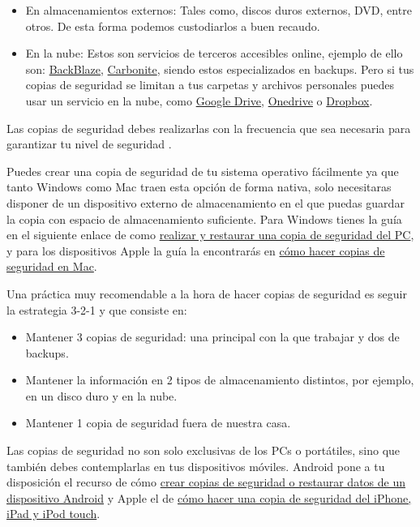 \documentclass[
  spanish,
  a4paper,
  openany]{book}
\begin{document}
\begin{itemize}
\item
  En almacenamientos externos: Tales como, discos duros externos, DVD, entre otros. De esta forma podemos custodiarlos a buen recaudo.
\item
  En la nube: Estos son servicios de terceros accesibles online, ejemplo de ello son: \href{https://www.backblaze.com/home-1.html}{BackBlaze}, \href{https://www.carbonite.com/}{Carbonite}, siendo estos especializados en backups. Pero si tus copias de seguridad se limitan a tus carpetas y archivos personales puedes usar un servicio en la nube, como \href{https://www.google.com/intl/en_in/drive/}{Google Drive}, \href{https://www.microsoft.com/en-us/microsoft-365/onedrive/online-cloud-storage}{Onedrive} o \href{https://www.dropbox.com/}{Dropbox}.
\end{itemize}

Las copias de seguridad debes realizarlas con la frecuencia que sea necesaria para garantizar tu nivel de seguridad \citep{tipos-copia-seguridad}.

Puedes crear una copia de seguridad de tu sistema operativo fácilmente ya que tanto Windows como Mac traen esta opción de forma nativa, solo necesitaras disponer de un dispositivo externo de almacenamiento en el que puedas guardar la copia con espacio de almacenamiento suficiente. Para Windows tienes la guía en el siguiente enlace de como \href{https://support.microsoft.com/es-es/windows/realizar-y-restaurar-una-copia-de-seguridad-del-pc-ac359b36-7015-4694-de9a-c5eac1ce9d9c}{realizar y restaurar una copia de seguridad del PC}, y para los dispositivos Apple la guía la encontrarás en \href{https://support.apple.com/es-es/mac-backup}{cómo hacer copias de seguridad en Mac}.

Una práctica muy recomendable a la hora de hacer copias de seguridad es seguir la estrategia 3-2-1 \citep{INCI-copia-3-2-1} y que consiste en:

\begin{itemize}
\item
  Mantener 3 copias de seguridad: una principal con la que trabajar y dos de backups.
\item
  Mantener la información en 2 tipos de almacenamiento distintos, por ejemplo, en un disco duro y en la nube.
\item
  Mantener 1 copia de seguridad fuera de nuestra casa.
\end{itemize}

Las copias de seguridad no son solo exclusivas de los PCs o portátiles, sino que también debes contemplarlas en tus dispositivos móviles. Android pone a tu disposición el recurso de cómo \href{https://support.google.com/android/answer/2819582?hl=es\&visit_id=637514255756661953-3969236140\&rd=1}{crear copias de seguridad o restaurar datos de un dispositivo Android} y Apple el de \href{https://support.apple.com/es-es/HT203977}{cómo hacer una copia de seguridad del iPhone, iPad y iPod touch}.
\end{document}
